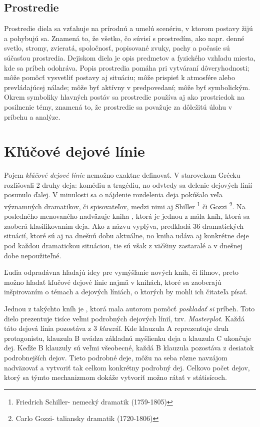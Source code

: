 \subsection*{Prostredie}
Prostredie diela sa vzťahuje na prírodnú a umelú scenériu, v ktorom postavy žijú a pohybujú sa. Znamená to, že všetko, čo súvisí s prostredím, ako napr. denné svetlo, stromy, zvieratá, spoločnosť, popisované zvuky, pachy a počasie sú súčasťou prostredia. Dejiskom diela je opis predmetov a fyzického vzhľadu miesta, kde sa príbeh odohráva.
Popis prostredia pomáha pri vytváraní dôveryhodnosti; môže pomôcť vysvetliť postavy aj situáciu; môže prispieť k atmosfére alebo prevládajúcej nálade; môže byť aktívny v predpovedaní; môže byť symbolickým. Okrem symboliky hlavných postáv sa prostredie používa aj ako prostriedok na posilnenie témy, znamená to, že prostredie sa považuje za dôležitú úlohu v príbehu a analýze.



\section{Kľúčové dejové línie}
\label{kdl}
Pojem \textit{kľúčové dejové línie} nemožno exaktne definovať. V starovekom Grécku rozlišovali 
2 druhy deja: komédiu a tragédiu, no odvtedy sa delenie dejových línií posunulo ďalej. V minulosti sa o nájdenie rozdelenia deja pokúšalo veľa významných dramatikov, či spisovateľov, medzi nimi aj Shiller \footnote{Friedrich Schiller- nemecký dramatik (1759-1805)} či Gozzi \footnote{Carlo Gozzi- taliansky dramatik (1720-1806)}. Na posledného menovaného nadväzuje kniha  \cite{Polti:1921}, ktorá je jednou z mála kníh, ktorá sa zaoberá klasifikovaním deja. Ako z názvu vyplýva, predkladá 36 dramatických situácií, ktoré sú aj na dnešnú dobu aktuálne, no kniha udáva aj konkrétne deje pod každou dramatickou situáciou, tie sú však z väčšiny zastaralé a v dnešnej dobe nepoužiteľné.

Ľudia odpradávna hľadajú idey pre vymýšľanie nových kníh, či filmov, preto možno hľadať kľučové dejové línie najmä v knihách, ktoré sa zaoberajú inšpirovaním o témach a dejových líniách, o ktorých by mohli ich čitateľa písať. 

Jednou z takýchto kníh je  \cite{Cook:1928}, ktorá mala autorom pomôcť \textit{poskladať si} príbeh. Toto dielo prezentuje tisíce veľmi podrobných dejových línií, tzv. \textit{Masterplot}. Každá táto dejová línia pozostáva z 3 \textit{klauzúl}. Kde klauzula A reprezentuje druh protagonistu, klauzula B uvádza základnú myšlienku deja a klauzula C ukončuje dej. Keďže B klauzuly sú veľmi všeobecné, každá B klauzula pozostáva z desiatok podrobnejších dejov. Tieto podrobné deje, môžu na seba rôzne navzájom nadväzovať a vytvoriť tak celkom konkrétny podrobný dej. Celkovo počet dejov, ktorý sa týmto mechanizmom dokáže vytvoriť možno rátať v státisícoch.

